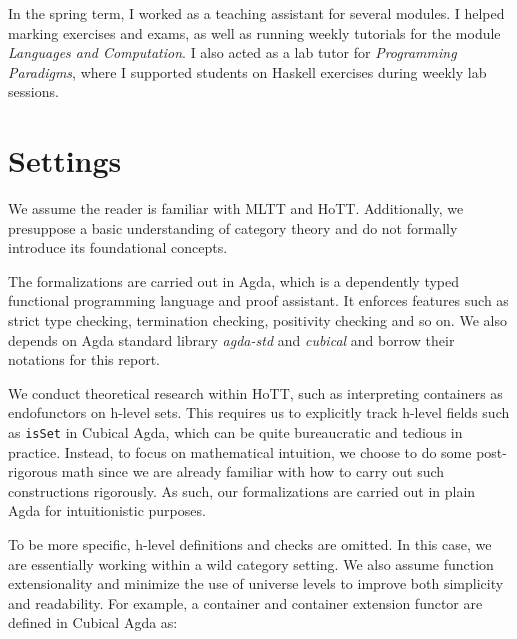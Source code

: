 In the spring term, I worked as a teaching assistant for several modules. I helped marking exercises and exams, as well as running weekly tutorials for the module \textit{Languages and Computation}. I also acted as a lab tutor for \textit{Programming Paradigms}, where I supported students on Haskell exercises during weekly lab sessions.

\section{Settings}

We assume the reader is familiar with MLTT and HoTT. Additionally, we presuppose a basic understanding of category theory and do not formally introduce its foundational concepts.

The formalizations are carried out in Agda, which is a dependently typed functional programming language and proof assistant. It enforces features such as strict type checking, termination checking, positivity checking and so on. We also depends on Agda standard library \textit{agda-std} and \textit{cubical} and borrow their notations for this report.

We conduct theoretical research within HoTT, such as interpreting containers as endofunctors on h-level sets. This requires us to explicitly track h-level fields such as \texttt{isSet} in Cubical Agda, which can be quite bureaucratic and tedious in practice. Instead, to focus on mathematical intuition, we choose to do some post-rigorous math since we are already familiar with how to carry out such constructions rigorously. As such, our formalizations are carried out in plain Agda for intuitionistic purposes.

To be more specific, h-level definitions and checks are omitted. In this case, we are essentially working within a wild category setting. We also assume function extensionality and minimize the use of universe levels to improve both simplicity and readability. For example, a container and container extension functor are defined in Cubical Agda as:

